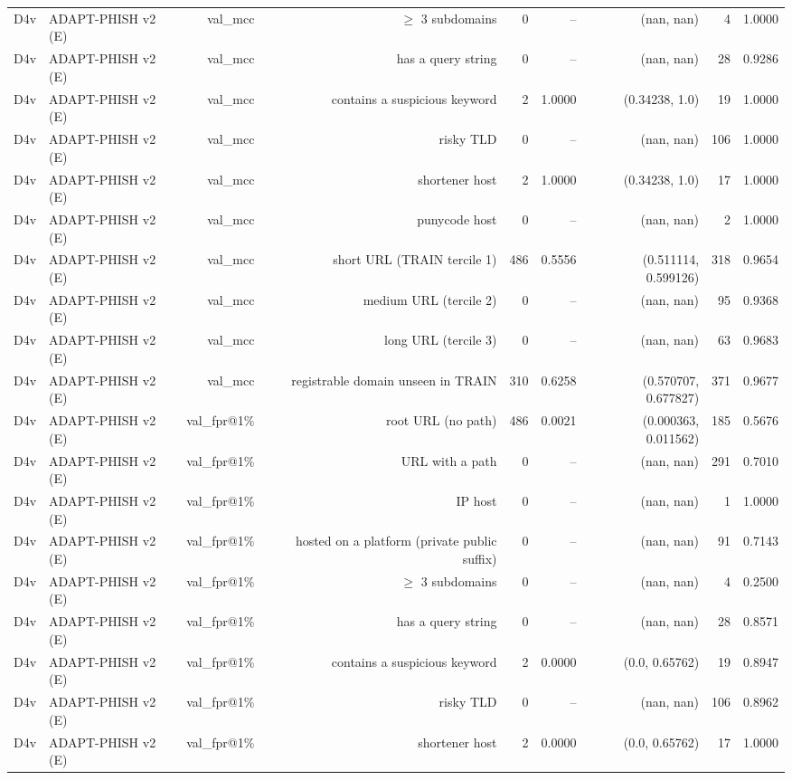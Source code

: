 \begin{table}[t]
\begin{tabular}{llrrrrrrr}
D4v & ADAPT-PHISH v2 (E) & val\_mcc & $\geq$ 3 subdomains & 0 & -- & (nan, nan) & 4 & 1.0000 \\
D4v & ADAPT-PHISH v2 (E) & val\_mcc & has a query string & 0 & -- & (nan, nan) & 28 & 0.9286 \\
D4v & ADAPT-PHISH v2 (E) & val\_mcc & contains a suspicious keyword & 2 & 1.0000 & (0.34238, 1.0) & 19 & 1.0000 \\
D4v & ADAPT-PHISH v2 (E) & val\_mcc & risky TLD & 0 & -- & (nan, nan) & 106 & 1.0000 \\
D4v & ADAPT-PHISH v2 (E) & val\_mcc & shortener host & 2 & 1.0000 & (0.34238, 1.0) & 17 & 1.0000 \\
D4v & ADAPT-PHISH v2 (E) & val\_mcc & punycode host & 0 & -- & (nan, nan) & 2 & 1.0000 \\
D4v & ADAPT-PHISH v2 (E) & val\_mcc & short URL (TRAIN tercile 1) & 486 & 0.5556 & (0.511114, 0.599126) & 318 & 0.9654 \\
D4v & ADAPT-PHISH v2 (E) & val\_mcc & medium URL (tercile 2) & 0 & -- & (nan, nan) & 95 & 0.9368 \\
D4v & ADAPT-PHISH v2 (E) & val\_mcc & long URL (tercile 3) & 0 & -- & (nan, nan) & 63 & 0.9683 \\
D4v & ADAPT-PHISH v2 (E) & val\_mcc & registrable domain unseen in TRAIN & 310 & 0.6258 & (0.570707, 0.677827) & 371 & 0.9677 \\
D4v & ADAPT-PHISH v2 (E) & val\_fpr@1\% & root URL (no path) & 486 & 0.0021 & (0.000363, 0.011562) & 185 & 0.5676 \\
D4v & ADAPT-PHISH v2 (E) & val\_fpr@1\% & URL with a path & 0 & -- & (nan, nan) & 291 & 0.7010 \\
D4v & ADAPT-PHISH v2 (E) & val\_fpr@1\% & IP host & 0 & -- & (nan, nan) & 1 & 1.0000 \\
D4v & ADAPT-PHISH v2 (E) & val\_fpr@1\% & hosted on a platform (private public suffix) & 0 & -- & (nan, nan) & 91 & 0.7143 \\
D4v & ADAPT-PHISH v2 (E) & val\_fpr@1\% & $\geq$ 3 subdomains & 0 & -- & (nan, nan) & 4 & 0.2500 \\
D4v & ADAPT-PHISH v2 (E) & val\_fpr@1\% & has a query string & 0 & -- & (nan, nan) & 28 & 0.8571 \\
D4v & ADAPT-PHISH v2 (E) & val\_fpr@1\% & contains a suspicious keyword & 2 & 0.0000 & (0.0, 0.65762) & 19 & 0.8947 \\
D4v & ADAPT-PHISH v2 (E) & val\_fpr@1\% & risky TLD & 0 & -- & (nan, nan) & 106 & 0.8962 \\
D4v & ADAPT-PHISH v2 (E) & val\_fpr@1\% & shortener host & 2 & 0.0000 & (0.0, 0.65762) & 17 & 1.0000 \\

\end{tabular}
\end{table}
